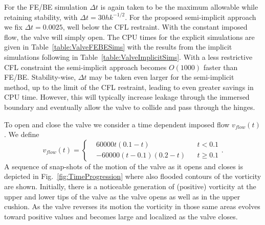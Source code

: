 \documentclass[preprint,12pt]{elsarticle}
\begin{document}
For the FE/BE simulation $\Delta t$ is again taken to be the maximum allowable while retaining stability, with $\Delta t = 30h k^{-1/2}$. For the proposed semi-implicit approach we fix $\Delta t=0.0025$, well below the CFL restraint. 
With the
constant imposed flow, the valve will simply open. The CPU times for the explicit simulations are given in Table~\ref{table:ValveFEBESims} with the results from the implicit simulations following in 
Table~\ref{table:ValveImplicitSims}. With a less restrictive CFL constraint the semi-implicit approach becomes $O(1000)$
faster than FE/BE. Stability-wise,  $\Delta t$ may be taken even larger for the semi-implicit method,  up to the limit of the CFL restraint, leading to even greater savings in CPU time. However, this will typically increase leakage through the immersed boundary and eventually allow the valve to collide and pass through the hinges.

To open and close the valve we consider a time dependent imposed flow $v_{flow}(t)$.
We define
\begin{equation}
v_{flow}(t) =
\left\{
\begin{array}{cccc}
&60000t(0.1-t)& &t<0.1 \\
&-60000(t-0.1)(0.2-t)& &t\geq 0.1
\end{array}
\right. .
\label{eqn:VariableFlow}
\end{equation}
A sequence of snap-shots of the motion of the valve as it opens and closes is depicted in Fig.~\ref{fig:TimeProgression}
where also flooded contours of the vorticity are shown. Initially, there is a noticeable generation of (positive) vorticity at the upper and lower tips of the valve as the valve opens as well as in the upper cushion. As the valve reverses its motion the vorticity in those same
areas evolves toward positive values and becomes large and localized as the valve closes. 
 
\end{document}
